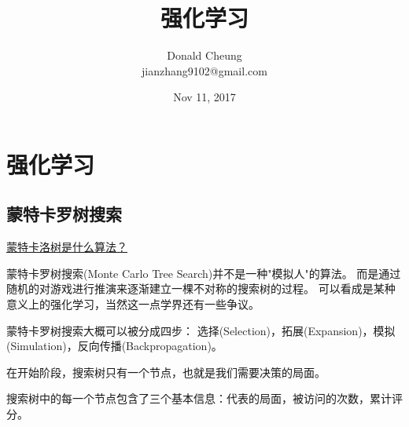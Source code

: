 \documentclass[10pt,a4paper]{ctexbook}
\title{强化学习}
\author{Donald Cheung\\jianzhang9102@gmail.com}
\date{Nov 11, 2017}
\begin{document}
    \maketitle
    \tableofcontents
\fi

\chapter{强化学习}

\section{蒙特卡罗树搜索}
\href{https://www.zhihu.com/question/39916945}{蒙特卡洛树是什么算法？}


蒙特卡罗树搜索(Monte Carlo Tree Search)并不是一种"模拟人"的算法。
而是通过随机的对游戏进行推演来逐渐建立一棵不对称的搜索树的过程。
可以看成是某种意义上的强化学习，当然这一点学界还有一些争议。

蒙特卡罗树搜索大概可以被分成四步：
选择(Selection)，拓展(Expansion)，模拟(Simulation)，反向传播(Backpropagation)。

在开始阶段，搜索树只有一个节点，也就是我们需要决策的局面。

搜索树中的每一个节点包含了三个基本信息：代表的局面，被访问的次数，累计评分。
\end{document}
